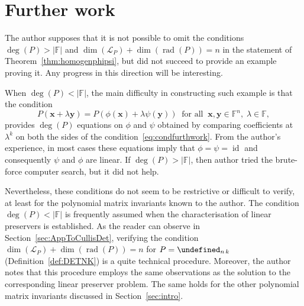 \documentclass{elsarticle}
\let\det\undefined
\DeclareMathOperator{\det}{det}
\DeclareMathOperator{\id}{id}
\DeclareMathOperator{\rad}{rad}
\def\F{{\mathbb F}}
\theoremstyle{definition}
\numberwithin{equation}{section}
\begin{document}
\section{Further work}
\label{sec:furthwork}

The author supposes that it is not possible to omit the conditions $\deg (P) > |\F|$ and $\dim (\mathcal L_P) + \dim (\rad(P)) = n$ in the statement of Theorem~\ref{thm:homogenphipsi}, but did not succeed to provide an example proving it. Any progress in this direction will be interesting.

When $\deg(P) < |\F|$, the main difficulty in constructing such example is that the condition 
\begin{equation}\label{eq:condfurthwork}
P(\mathbf{x} + \lambda \mathbf{y}) = P(\phi(\mathbf{x}) + \lambda \psi(\mathbf{y}))\;\;\mbox{for all}\;\;\mathbf{x},\mathbf{y} \in \mathbb \F^n,\; \lambda \in \F,
\end{equation}
provides $\deg(P)$ equations on $\phi$ and $\psi$ obtained by comparing coefficients at $\lambda^k$ on both the sides of the condition~\eqref{eq:condfurthwork}. From the author's experience, in most cases these equations imply that $\phi = \psi = \id$ and consequently $\psi$ and $\phi$ are linear. If $\deg(P) > |\F|$, then author tried the brute-force computer search, but it did not help.

Nevertheless, these conditions do not seem to be restrictive or difficult to verify, at least for the polynomial matrix invariants known to the author. The condition $\deg (P) < |\F|$ is frequently assumed when the characterisation of linear preservers is established. As the reader can observe in Section~\ref{sec:AppToCullisDet}, verifying the condition $\dim (\mathcal L_P) + \dim (\rad(P)) = n$ for $P = \det_{n\,k}$ (Definition~\ref{def:DETNK}) is a quite technical procedure. Moreover, the author notes that this procedure employs the same observations as the solution to the corresponding linear preserver problem. The same holds for the other polynomial matrix invariants discussed in Section~\ref{sec:intro}. %
\end{document}
